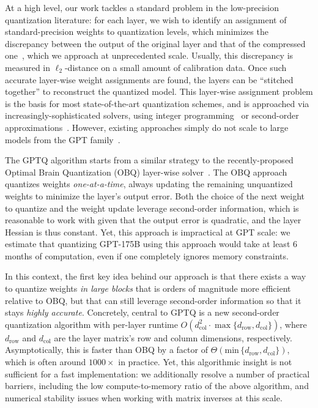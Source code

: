 At a high level, our work tackles a standard problem in the low-precision quantization literature: for each layer, we wish to identify an assignment of standard-precision weights to quantization levels, which minimizes the discrepancy between the output of the original layer and that of the compressed one~\cite{nagel2020up, li2021brecq, hubara2021accurate, yao2022zeroquant, frantar2022obc}, which we approach at unprecedented scale. Usually, this discrepancy is measured in $\ell_2$-distance on a small amount of calibration data. Once such accurate layer-wise weight assignments are found, the layers can be ``stitched together'' to reconstruct the quantized model. This layer-wise assignment problem is the basis for most state-of-the-art quantization schemes, and is approached via increasingly-sophisticated solvers, using integer programming~\cite{hubara2020improving} or second-order approximations~\cite{li2021brecq, frantar2022obc}. However, existing approaches simply do not scale to large models from the GPT family~\cite{yao2022zeroquant}.

The GPTQ algorithm starts from a similar strategy to the recently-proposed Optimal Brain Quantization (OBQ) layer-wise solver~\cite{frantar2022obc}. The OBQ approach quantizes weights \emph{one-at-a-time}, always updating the remaining unquantized weights to minimize the layer's output error. Both the choice of the next weight to quantize and the weight update leverage second-order information, which is reasonable to work with given that the output error is quadratic, and the layer Hessian is thus constant. Yet, this approach is impractical at GPT scale: we estimate that quantizing GPT-175B using this approach would take at least 6 months of computation, even if one completely ignores memory constraints. 

In this context, the first key idea behind our approach is that there exists a way to quantize weights \emph{in large blocks} that is orders of magnitude more efficient relative to OBQ, but that can still leverage second-order information so that it stays \emph{highly accurate}. Concretely, central to GPTQ is a new second-order quantization algorithm with per-layer runtime $O( d_\text{col}^2 \cdot \max \{ d_\text{row} , d_\text{col} \})$, 
where $d_\text{row}$ and $d_\text{col}$ are the layer matrix's row and column dimensions, respectively. Asymptotically, this is faster than OBQ by a factor of $\Theta(\text{min} \, \{d_\text{row}, d_\text{col}\})$, which is often around $1000\times$ in practice. Yet, this algorithmic insight is not sufficient for a fast implementation: we additionally resolve a number of practical barriers, including the low compute-to-memory ratio of the above algorithm, and numerical stability issues when working with matrix inverses at this scale.

